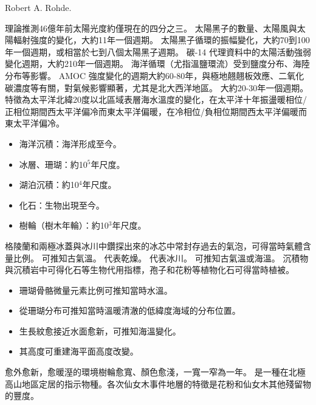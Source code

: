 \documentclass[a4paper,12pt]{report}
\begin{document}
\bct\bfH\ctr{}\caption{Robert A. Rohde.}\ef\FB\ect
{}
理論推測46億年前太陽光度約僅現在的四分之三。
太陽黑子的數量、太陽風與太陽輻射強度的變化，大約11年一個週期。
太陽黑子循環的振幅變化，大約70到100年一個週期，或相當於七到八個太陽黑子週期。
碳-14 代理資料中的太陽活動強弱變化週期，大約210年一個週期。
海洋循環（尤指溫鹽環流）受到鹽度分布、海陸分布等影響。
AMOC 強度變化的週期大約60-80年，與極地翹翹板效應、二氧化碳濃度等有關，對氣候影響顯著，尤其是北大西洋地區。
大約20-30年一個週期。特徵為太平洋北緯20度以北區域表層海水溫度的變化，在太平洋十年振盪暖相位/正相位期間西太平洋偏冷而東太平洋偏暖，在冷相位/負相位期間西太平洋偏暖而東太平洋偏冷。
\begin{itemize}
\item 海洋沉積：海洋形成至今。
\item 冰層、珊瑚：約10$^5$年尺度。
\item 湖泊沉積：約10$^4$年尺度。
\item 化石：生物出現至今。
\item 樹輪（樹木年輪）：約10$^3$年尺度。
\end{itemize}
格陵蘭和兩極冰蓋與冰川中鑽探出來的冰芯中常封存過去的氣泡，可得當時氣體含量比例。
可推知古氣溫。
代表乾燥。
代表冰川。
可推知古氣溫或海溫。
沉積物與沉積岩中可得化石等生物代用指標，孢子和花粉等植物化石可得當時植被。
\begin{itemize}
\item 珊瑚骨骼微量元素比例可推知當時水溫。
\item 從珊瑚分布可推知當時溫暖清澈的低緯度海域的分布位置。
\item 生長紋愈接近水面愈新，可推知海溫變化。
\item 其高度可重建海平面高度改變。
\end{itemize}
愈外愈新，愈暖溼的環境樹輪愈寬、顏色愈淺，一寬一窄為一年。
是一種在北極高山地區定居的指示物種。各次仙女木事件地層的特徵是花粉和仙女木其他殘留物的豐度。
\end{document}
